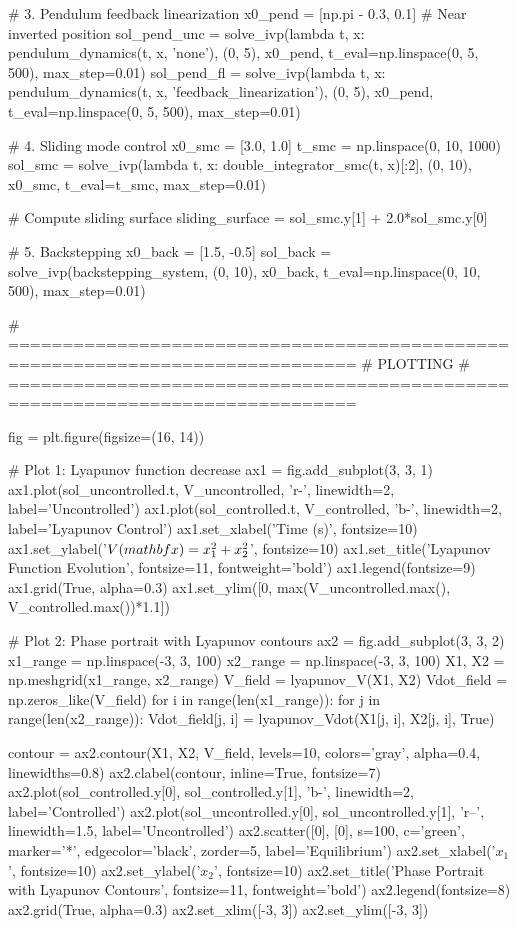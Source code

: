 \documentclass[a4paper, 11pt]{article}
\begin{document}
\begin{pycode}
# 3. Pendulum feedback linearization
x0_pend = [np.pi - 0.3, 0.1]  # Near inverted position
sol_pend_unc = solve_ivp(lambda t, x: pendulum_dynamics(t, x, 'none'),
                         (0, 5), x0_pend, t_eval=np.linspace(0, 5, 500), max_step=0.01)
sol_pend_fl = solve_ivp(lambda t, x: pendulum_dynamics(t, x, 'feedback_linearization'),
                        (0, 5), x0_pend, t_eval=np.linspace(0, 5, 500), max_step=0.01)

# 4. Sliding mode control
x0_smc = [3.0, 1.0]
t_smc = np.linspace(0, 10, 1000)
sol_smc = solve_ivp(lambda t, x: double_integrator_smc(t, x)[:2],
                    (0, 10), x0_smc, t_eval=t_smc, max_step=0.01)

# Compute sliding surface
sliding_surface = sol_smc.y[1] + 2.0*sol_smc.y[0]

# 5. Backstepping
x0_back = [1.5, -0.5]
sol_back = solve_ivp(backstepping_system, (0, 10), x0_back,
                     t_eval=np.linspace(0, 10, 500), max_step=0.01)

# ==============================================================================
# PLOTTING
# ==============================================================================

fig = plt.figure(figsize=(16, 14))

# Plot 1: Lyapunov function decrease
ax1 = fig.add_subplot(3, 3, 1)
ax1.plot(sol_uncontrolled.t, V_uncontrolled, 'r-', linewidth=2, label='Uncontrolled')
ax1.plot(sol_controlled.t, V_controlled, 'b-', linewidth=2, label='Lyapunov Control')
ax1.set_xlabel('Time (s)', fontsize=10)
ax1.set_ylabel('$V(\\mathbf{x}) = x_1^2 + x_2^2$', fontsize=10)
ax1.set_title('Lyapunov Function Evolution', fontsize=11, fontweight='bold')
ax1.legend(fontsize=9)
ax1.grid(True, alpha=0.3)
ax1.set_ylim([0, max(V_uncontrolled.max(), V_controlled.max())*1.1])

# Plot 2: Phase portrait with Lyapunov contours
ax2 = fig.add_subplot(3, 3, 2)
x1_range = np.linspace(-3, 3, 100)
x2_range = np.linspace(-3, 3, 100)
X1, X2 = np.meshgrid(x1_range, x2_range)
V_field = lyapunov_V(X1, X2)
Vdot_field = np.zeros_like(V_field)
for i in range(len(x1_range)):
    for j in range(len(x2_range)):
        Vdot_field[j, i] = lyapunov_Vdot(X1[j, i], X2[j, i], True)

contour = ax2.contour(X1, X2, V_field, levels=10, colors='gray', alpha=0.4, linewidths=0.8)
ax2.clabel(contour, inline=True, fontsize=7)
ax2.plot(sol_controlled.y[0], sol_controlled.y[1], 'b-', linewidth=2, label='Controlled')
ax2.plot(sol_uncontrolled.y[0], sol_uncontrolled.y[1], 'r--', linewidth=1.5, label='Uncontrolled')
ax2.scatter([0], [0], s=100, c='green', marker='*', edgecolor='black', zorder=5, label='Equilibrium')
ax2.set_xlabel('$x_1$', fontsize=10)
ax2.set_ylabel('$x_2$', fontsize=10)
ax2.set_title('Phase Portrait with Lyapunov Contours', fontsize=11, fontweight='bold')
ax2.legend(fontsize=8)
ax2.grid(True, alpha=0.3)
ax2.set_xlim([-3, 3])
ax2.set_ylim([-3, 3])


\end{pycode}
\end{document}
